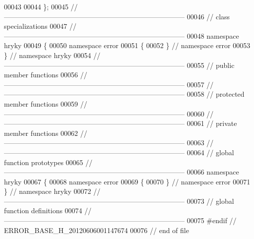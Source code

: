 \begin{DoxyCode}
00043 
00044 \};
00045 \textcolor{comment}{//
      ------------------------------------------------------------------------------}
00046 \textcolor{comment}{// class specializations}
00047 \textcolor{comment}{//
      ------------------------------------------------------------------------------}
00048 \textcolor{keyword}{namespace }hryky
00049 \{
00050 \textcolor{keyword}{namespace }error
00051 \{
00052 \} \textcolor{comment}{// namespace error}
00053 \} \textcolor{comment}{// namespace hryky}
00054 \textcolor{comment}{//
      ------------------------------------------------------------------------------}
00055 \textcolor{comment}{// public member functions}
00056 \textcolor{comment}{//
      ------------------------------------------------------------------------------}
00057 \textcolor{comment}{//
      ------------------------------------------------------------------------------}
00058 \textcolor{comment}{// protected member functions}
00059 \textcolor{comment}{//
      ------------------------------------------------------------------------------}
00060 \textcolor{comment}{//
      ------------------------------------------------------------------------------}
00061 \textcolor{comment}{// private member functions}
00062 \textcolor{comment}{//
      ------------------------------------------------------------------------------}
00063 \textcolor{comment}{//
      ------------------------------------------------------------------------------}
00064 \textcolor{comment}{// global function prototypes}
00065 \textcolor{comment}{//
      ------------------------------------------------------------------------------}
00066 \textcolor{keyword}{namespace }hryky
00067 \{
00068 \textcolor{keyword}{namespace }error
00069 \{
00070 \} \textcolor{comment}{// namespace error}
00071 \} \textcolor{comment}{// namespace hryky}
00072 \textcolor{comment}{//
      ------------------------------------------------------------------------------}
00073 \textcolor{comment}{// global function definitions}
00074 \textcolor{comment}{//
      ------------------------------------------------------------------------------}
00075 \textcolor{preprocessor}{#endif // ERROR\_BASE\_H\_20120606001147674}
00076 \textcolor{preprocessor}{}\textcolor{comment}{// end of file}
\end{DoxyCode}
